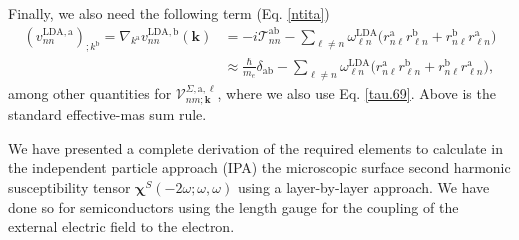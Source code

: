Finally,
we also need the following term (Eq. \eqref{ntita})
\begin{align}\label{a.3c}
(v^{\mathrm{LDA},\mathrm{a}}_{nn})_{;k^\mathrm{b}}
=
\nabla_{k^{\mathrm{a}}}  
v^{\mathrm{LDA},\mathrm{b}}_{nn}(\mathbf{k})
&=
-i\mathcal{T}^{\mathrm{a}\mathrm{b}}_{nn}
-
\sum_{\ell\ne n}
\omega^{\mathrm{LDA}}_{\ell n}
\bigg(  
r^{\mathrm{a}}_{n\ell}  
r^{\mathrm{b}}_{\ell n}
+  
r^{\mathrm{b}}_{n\ell}  
r^{\mathrm{a}}_{\ell n}
\bigg)
\nonumber\\
&\approx
\frac{\hbar}{m_{e}}\delta_{\mathrm{a}\mathrm{b}}
-
\sum_{\ell\ne n}
\omega^{\mathrm{LDA}}_{\ell n}
\bigg(  
r^{\mathrm{a}}_{n\ell}  
r^{\mathrm{b}}_{\ell n}
+  
r^{\mathrm{b}}_{n\ell}  
r^{\mathrm{a}}_{\ell n}
\bigg)
,
\end{align}  
among other quantities for $\mathcal{V}^{\Sigma,\mathrm{a},\ell}_{nm;\mathbf{k}}$, where we 
also use Eq. \eqref{tau.69}. Above is the standard effective-mas sum rule.
\cite{ashcroftbook} 

We have presented a complete derivation of the required elements to
calculate in the independent particle approach (IPA) the microscopic  
surface second harmonic susceptibility tensor $\boldsymbol{\chi}^S(-2\omega;\omega,\omega)$ 
using a layer-by-layer approach. We have done so for semiconductors using 
the length gauge for the coupling of the external electric field to the 
electron. 

\stopcontents[chapters]

